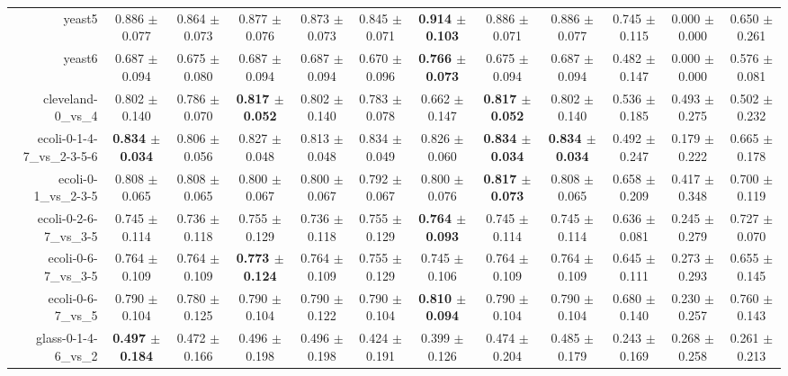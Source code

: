 \begin{table}[!ht]
{\begin{tabular}{r c c c c c c c c c c c}
yeast5 & 0.886 $\pm$ 0.077 & 0.864 $\pm$ 0.073 & 0.877 $\pm$ 0.076 & 0.873 $\pm$ 0.073 & 0.845 $\pm$ 0.071 & \textbf{0.914 $\pm$ 0.103} & 0.886 $\pm$ 0.071 & 0.886 $\pm$ 0.077 & 0.745 $\pm$ 0.115 & 0.000 $\pm$ 0.000 & 0.650 $\pm$ 0.261 \\
yeast6 & 0.687 $\pm$ 0.094 & 0.675 $\pm$ 0.080 & 0.687 $\pm$ 0.094 & 0.687 $\pm$ 0.094 & 0.670 $\pm$ 0.096 & \textbf{0.766 $\pm$ 0.073} & 0.675 $\pm$ 0.094 & 0.687 $\pm$ 0.094 & 0.482 $\pm$ 0.147 & 0.000 $\pm$ 0.000 & 0.576 $\pm$ 0.081 \\
cleveland-0\_vs\_4 & 0.802 $\pm$ 0.140 & 0.786 $\pm$ 0.070 & \textbf{0.817 $\pm$ 0.052} & 0.802 $\pm$ 0.140 & 0.783 $\pm$ 0.078 & 0.662 $\pm$ 0.147 & \textbf{0.817 $\pm$ 0.052} & 0.802 $\pm$ 0.140 & 0.536 $\pm$ 0.185 & 0.493 $\pm$ 0.275 & 0.502 $\pm$ 0.232 \\
ecoli-0-1-4-7\_vs\_2-3-5-6 & \textbf{0.834 $\pm$ 0.034} & 0.806 $\pm$ 0.056 & 0.827 $\pm$ 0.048 & 0.813 $\pm$ 0.048 & 0.834 $\pm$ 0.049 & 0.826 $\pm$ 0.060 & \textbf{0.834 $\pm$ 0.034} & \textbf{0.834 $\pm$ 0.034} & 0.492 $\pm$ 0.247 & 0.179 $\pm$ 0.222 & 0.665 $\pm$ 0.178 \\
ecoli-0-1\_vs\_2-3-5 & 0.808 $\pm$ 0.065 & 0.808 $\pm$ 0.065 & 0.800 $\pm$ 0.067 & 0.800 $\pm$ 0.067 & 0.792 $\pm$ 0.067 & 0.800 $\pm$ 0.076 & \textbf{0.817 $\pm$ 0.073} & 0.808 $\pm$ 0.065 & 0.658 $\pm$ 0.209 & 0.417 $\pm$ 0.348 & 0.700 $\pm$ 0.119 \\
ecoli-0-2-6-7\_vs\_3-5 & 0.745 $\pm$ 0.114 & 0.736 $\pm$ 0.118 & 0.755 $\pm$ 0.129 & 0.736 $\pm$ 0.118 & 0.755 $\pm$ 0.129 & \textbf{0.764 $\pm$ 0.093} & 0.745 $\pm$ 0.114 & 0.745 $\pm$ 0.114 & 0.636 $\pm$ 0.081 & 0.245 $\pm$ 0.279 & 0.727 $\pm$ 0.070 \\
ecoli-0-6-7\_vs\_3-5 & 0.764 $\pm$ 0.109 & 0.764 $\pm$ 0.109 & \textbf{0.773 $\pm$ 0.124} & 0.764 $\pm$ 0.109 & 0.755 $\pm$ 0.129 & 0.745 $\pm$ 0.106 & 0.764 $\pm$ 0.109 & 0.764 $\pm$ 0.109 & 0.645 $\pm$ 0.111 & 0.273 $\pm$ 0.293 & 0.655 $\pm$ 0.145 \\
ecoli-0-6-7\_vs\_5 & 0.790 $\pm$ 0.104 & 0.780 $\pm$ 0.125 & 0.790 $\pm$ 0.104 & 0.790 $\pm$ 0.122 & 0.790 $\pm$ 0.104 & \textbf{0.810 $\pm$ 0.094} & 0.790 $\pm$ 0.104 & 0.790 $\pm$ 0.104 & 0.680 $\pm$ 0.140 & 0.230 $\pm$ 0.257 & 0.760 $\pm$ 0.143 \\
glass-0-1-4-6\_vs\_2 & \textbf{0.497 $\pm$ 0.184} & 0.472 $\pm$ 0.166 & 0.496 $\pm$ 0.198 & 0.496 $\pm$ 0.198 & 0.424 $\pm$ 0.191 & 0.399 $\pm$ 0.126 & 0.474 $\pm$ 0.204 & 0.485 $\pm$ 0.179 & 0.243 $\pm$ 0.169 & 0.268 $\pm$ 0.258 & 0.261 $\pm$ 0.213 \\

\end{tabular}}
\end{table}

